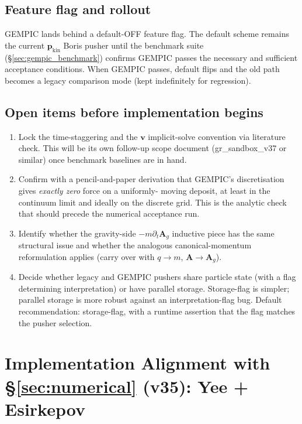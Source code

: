 \documentclass[11pt,a4paper]{article}
\newcommand{\vv}[1]{\mathbf{#1}}
\begin{document}
\subsection{Feature flag and rollout}

GEMPIC lands behind a default-OFF feature flag.  The default scheme
remains the current $\vv{p}_{\mathrm{kin}}$ Boris pusher until the
benchmark suite (§\ref{sec:gempic_benchmark}) confirms GEMPIC passes
the necessary and sufficient acceptance conditions.  When GEMPIC
passes, default flips and the old path becomes a legacy comparison
mode (kept indefinitely for regression).

\subsection{Open items before implementation begins}

\begin{enumerate}
  \item Lock the time-staggering and the $\vv{v}$ implicit-solve
    convention via literature check.  This will be its own
    follow-up scope document (gr\_sandbox\_v37 or similar) once
    benchmark baselines are in hand.
  \item Confirm with a pencil-and-paper derivation that GEMPIC's
    discretisation gives \emph{exactly zero} force on a uniformly-
    moving deposit, at least in the continuum limit and ideally on
    the discrete grid.  This is the analytic check that should
    precede the numerical acceptance run.
  \item Identify whether the gravity-side
    $-m\partial_t \vv{A}_g$ inductive piece has the same structural
    issue and whether the analogous canonical-momentum reformulation
    applies (carry over with $q \to m$, $\vv{A} \to \vv{A}_g$).
  \item Decide whether legacy and GEMPIC pushers share particle
    state (with a flag determining interpretation) or have
    parallel storage.  Storage-flag is simpler; parallel storage
    is more robust against an interpretation-flag bug.  Default
    recommendation: storage-flag, with a runtime assertion that
    the flag matches the pusher selection.
\end{enumerate}

\newpage

\section{Implementation Alignment with §\ref{sec:numerical} (v35): Yee + Esirkepov}
\label{sec:yee_pivot}
\end{document}
